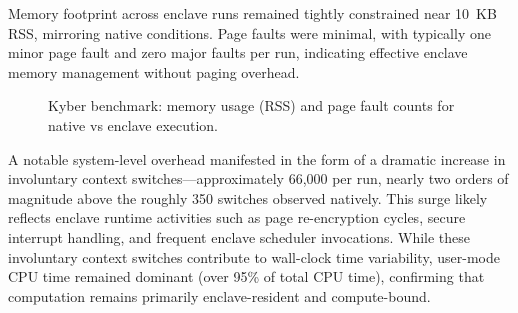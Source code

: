 
Memory footprint across enclave runs remained tightly constrained near 10~KB RSS, mirroring native conditions. Page faults were minimal, with typically one minor page fault and zero major faults per run, indicating effective enclave memory management without paging overhead.

\begin{figure}[htbp]
\centering
{}
\caption{Kyber benchmark: memory usage (RSS) and page fault counts for native vs enclave execution.}
\label{fig:memory_pagefaults_chart}
\end{figure}

A notable system-level overhead manifested in the form of a dramatic increase in involuntary context switches—approximately 66,000 per run, nearly two orders of magnitude above the roughly 350 switches observed natively. This surge likely reflects enclave runtime activities such as page re-encryption cycles, secure interrupt handling, and frequent enclave scheduler invocations. While these involuntary context switches contribute to wall-clock time variability, user-mode CPU time remained dominant (over 95\% of total CPU time), confirming that computation remains primarily enclave-resident and compute-bound.

